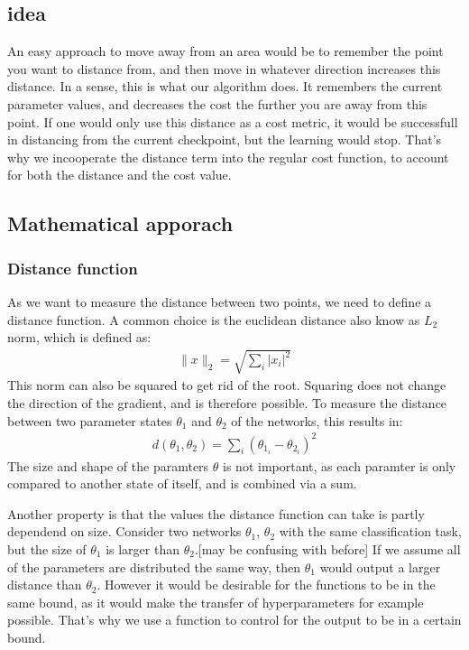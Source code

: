 \begin{comment}
motivations:
- different values for ensemble method
- seen that cells exists, escape these cells
- explore instead of exploit

\end{comment}
\subsection{idea}
An easy approach to move away from an area would be to remember the point you
want to distance from, and then move in whatever direction increases this
distance. In a sense, this is what our algorithm does. It remembers the current
parameter values, and decreases the cost the further you are away from this
point. If one would only use this distance as a cost metric, it would be
successfull in distancing from the current checkpoint, but the learning would
stop. That's why we incooperate the distance term into the regular cost
function, to account for both the distance and the cost value.
\subsection{Mathematical apporach}
\subsubsection{Distance function}\label{distance_function}
As we want to measure the distance between two points, we need to define a
distance function. A common choice is the euclidean distance also know as $L_2$
norm, which is defined as: 
\begin{align}
    \rVert x \lVert_2 = \sqrt{\sum_i \lvert x_i \rvert^2}
\end{align}
This norm can also be squared to get rid of the root. Squaring does not change
the direction of the gradient, and is therefore possible. To measure the
distance between two parameter states $\theta_1$ and $\theta_2$ of the networks,
this results in:
\begin{align}\label{eq:distance}
    d(\theta_1, \theta_2)= \sum_i (\theta_{1_i}-\theta_{2_i})^2
\end{align}
The size and shape of the paramters $\theta$ is not important, as each paramter
is only compared to another state of itself, and is combined via a sum.

Another property is that the values the distance function can take is partly
dependend on size. Consider two networks $\theta_1$, $\theta_2$ with the same
classification task, but the size of $\theta_1$ is larger than $\theta_2$.[may
be confusing with before] If we assume all of the parameters are distributed the
same way, then $\theta_1$ would output a larger distance than $\theta_2$.
However it would be desirable for the functions to be in the same bound, as it
would make the transfer of hyperparameters for example possible. That's why we
use a function to control for the output to be in a certain bound.

